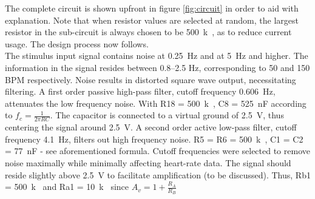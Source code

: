 The complete circuit is shown upfront in figure \ref{fig:circuit} in order to aid with explanation. Note that when resistor values are selected at random, the largest resistor in the sub-circuit is always chosen to be \SI{500}{k\Omega}, as to reduce current usage. The design process now follows.\\
The stimulus input signal contains noise at \SI{0.25}{Hz} and at \SI{5}{Hz} and higher. The information in the signal resides between \numrange{0.8}{2.5} \si{Hz}, corresponding to 50 and 150 BPM respectively. Noise results in distorted square wave output, necessitating filtering. A first order passive high-pass filter, cutoff frequency \SI{0.606}{Hz}, attenuates the low frequency noise. With R18 = \SI{500}{k\Omega}, C8 = \SI{525}{nF} according to $f_{c} = \frac{1}{2\pi R C}$. The capacitor is connected to a virtual ground of \SI{2.5}{V}, thus centering the signal around \SI{2.5}{V}. A second order active low-pass filter, cutoff frequency \SI{4.1}{Hz}, filters out high frequency noise. R5 = R6 = \SI{500}{k\Omega}, C1 = C2 = \SI{77}{nF} - see aforementioned formula. Cutoff frequencies were selected to remove noise maximally while minimally affecting heart-rate data. The signal should reside slightly above \SI{2.5}{V} to facilitate amplification (to be discussed). Thus, Rb1 = \SI{500}{k\Omega} and Ra1 = \SI{10}{k\Omega} since $A_v=1+\frac{R_{A}}{R_{B}}$ 
